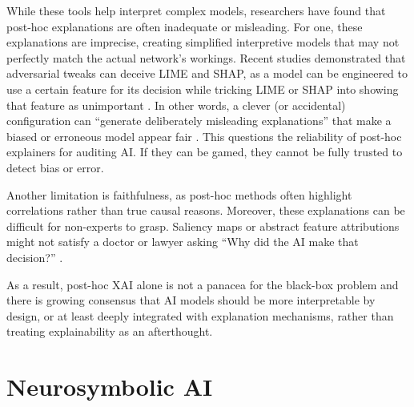 While these tools help interpret complex models, researchers have found that post-hoc explanations are often inadequate or misleading. For one, these explanations are imprecise, creating simplified interpretive models that may not perfectly match the actual network’s workings. Recent studies demonstrated that adversarial tweaks can deceive LIME and SHAP, as a model can be engineered to use a certain feature for its decision while tricking LIME or SHAP into showing that feature as unimportant \cite{slack2020foolinglimeshapadversarial}. In other words, a clever (or accidental) configuration can ``generate deliberately misleading explanations'' that make a biased or erroneous model appear fair \cite{slack2020foolinglimeshapadversarial}. This questions the reliability of post-hoc explainers for auditing AI. If they can be gamed, they cannot be fully trusted to detect bias or error.


Another limitation is faithfulness, as post-hoc methods often highlight correlations rather than true causal reasons. Moreover, these explanations can be difficult for non-experts to grasp. Saliency maps or abstract feature attributions might not satisfy a doctor or lawyer asking ``Why did the AI make that decision?'' \cite{yeh2019infidelitysensitivityexplanations}. 

As a result, post-hoc XAI alone is not a panacea for the black-box problem and there is growing consensus that AI models should be more interpretable by design, or at least deeply integrated with explanation mechanisms, rather than treating explainability as an afterthought.


\section{Neurosymbolic AI}
\label{sec:sec_nsai}

